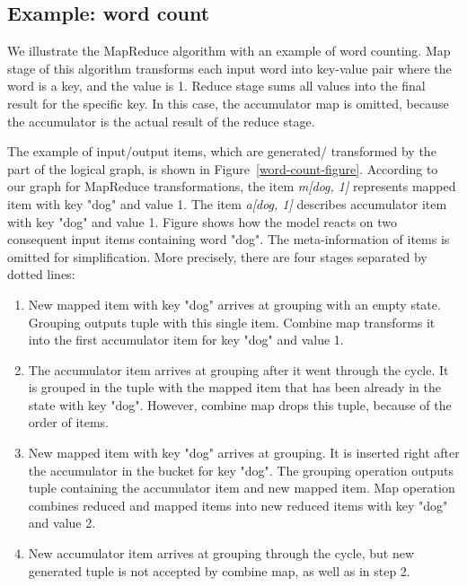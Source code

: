 \subsection{Example: word count}

We illustrate the MapReduce algorithm with an example of word counting. Map stage of this algorithm transforms each input word into key-value pair where the word is a key, and the value is 1. Reduce stage sums all values into the final result for the specific key. In this case, the accumulator map is omitted, because the accumulator is the actual result of the reduce stage.

The example of input/output items, which are generated/ transformed by the part of the logical graph, is shown in Figure~\ref {word-count-figure}. According to our graph for MapReduce transformations, the item {\it m[dog, 1]} represents mapped item with key "dog" and value 1. The item {\it a[dog, 1]} describes accumulator item with key "dog" and value 1. Figure shows how the model reacts on two consequent input items containing word "dog". The meta-information of items is omitted for simplification. More precisely, there are four stages separated by dotted lines:

\begin{enumerate}
    \item New mapped item with key "dog" arrives at grouping with an empty state. Grouping outputs tuple with this single item. Combine map transforms it into the first accumulator item for key "dog" and value 1.
    \item The accumulator item arrives at grouping after it went through the cycle. It is grouped in the tuple with the mapped item that has been already in the state with key "dog". However, combine map drops this tuple, because of the order of items.
    \item New mapped item with key "dog" arrives at grouping. It is inserted right after the accumulator in the bucket for key "dog". The grouping operation outputs tuple containing the accumulator item and new mapped item. Map operation combines reduced and mapped items into new reduced items with key "dog" and value 2.
    \item New accumulator item arrives at grouping through the cycle, but new generated tuple is not accepted by combine map, as well as in step 2.
\end{enumerate}

